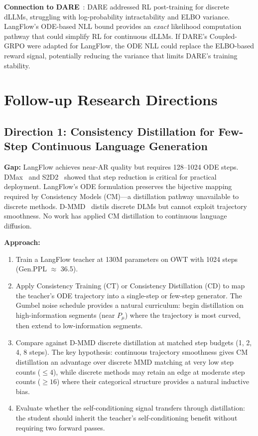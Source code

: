 \documentclass[11pt]{article}
\begin{document}
\textbf{Connection to DARE}~\cite{dare}: DARE addressed RL post-training for discrete dLLMs, struggling with log-probability intractability and ELBO variance. LangFlow's ODE-based NLL bound provides an \textit{exact} likelihood computation pathway that could simplify RL for continuous dLLMs. If DARE's Coupled-GRPO were adapted for LangFlow, the ODE NLL could replace the ELBO-based reward signal, potentially reducing the variance that limits DARE's training stability.

\section{Follow-up Research Directions}

\subsection{Direction 1: Consistency Distillation for Few-Step Continuous Language Generation}

\textbf{Gap:} LangFlow achieves near-AR quality but requires 128--1024 ODE steps. DMax~\cite{dmax} and S2D2~\cite{s2d2} showed that step reduction is critical for practical deployment. LangFlow's ODE formulation preserves the bijective mapping required by Consistency Models (CM)---a distillation pathway unavailable to discrete methods. D-MMD~\cite{dmmd} distils discrete DLMs but cannot exploit trajectory smoothness. No work has applied CM distillation to continuous language diffusion.

\textbf{Approach:}
\begin{enumerate}
    \item Train a LangFlow teacher at 130M parameters on OWT with 1024 steps (Gen.PPL $\approx$ 36.5).

    \item Apply Consistency Training (CT) or Consistency Distillation (CD) to map the teacher's ODE trajectory into a single-step or few-step generator. The Gumbel noise schedule provides a natural curriculum: begin distillation on high-information segments (near $P_\mu$) where the trajectory is most curved, then extend to low-information segments.

    \item Compare against D-MMD discrete distillation at matched step budgets (1, 2, 4, 8 steps). The key hypothesis: continuous trajectory smoothness gives CM distillation an advantage over discrete MMD matching at very low step counts ($\leq 4$), while discrete methods may retain an edge at moderate step counts ($\geq 16$) where their categorical structure provides a natural inductive bias.

    \item Evaluate whether the self-conditioning signal transfers through distillation: the student should inherit the teacher's self-conditioning benefit without requiring two forward passes.
\end{enumerate}
\end{document}
